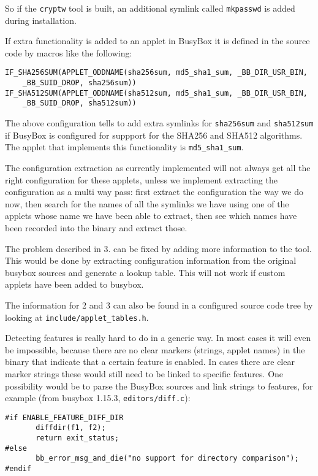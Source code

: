 \documentclass[10pt]{article}
\begin{document}
So if the \texttt{cryptw} tool is built, an additional symlink called
\texttt{mkpasswd} is added during installation.

If extra functionality is added to an applet in BusyBox it is defined in the
source code by macros like the following:

\begin{verbatim}
IF_SHA256SUM(APPLET_ODDNAME(sha256sum, md5_sha1_sum, _BB_DIR_USR_BIN,
    _BB_SUID_DROP, sha256sum))
IF_SHA512SUM(APPLET_ODDNAME(sha512sum, md5_sha1_sum, _BB_DIR_USR_BIN,
    _BB_SUID_DROP, sha512sum))
\end{verbatim}

The above configuration tells to add extra symlinks for \texttt{sha256sum} and
\texttt{sha512sum} if BusyBox is configured for suppport for the SHA256 and
SHA512 algorithms. The applet that implements this functionality is
\texttt{md5\_sha1\_sum}.

The configuration extraction as currently implemented will not always get all the right configuration for these applets, unless we implement extracting the configuration as a multi way pass: first extract the configuration the way we do now, then search for the names of all the symlinks we have using one of the applets whose name we have been able to extract, then see which names have been recorded into the binary and extract those.

The problem described in 3. can be fixed by adding more information to the tool. This would be done by extracting configuration information from the original busybox sources and generate a lookup table. This will not work if custom applets have been added to busybox.

The information for 2 and 3 can also be found in a configured source code tree by looking at \texttt{include/applet\_tables.h}.

Detecting features is really hard to do in a generic way. In most cases it will
even be impossible, because there are no clear markers (strings, applet names)
in the binary that indicate that a certain feature is enabled. In cases there
are clear marker strings these would still need to be linked to specific
features. One possibility would be to parse the BusyBox sources and link
strings to features, for example (from busybox 1.15.3,
\texttt{editors/diff.c}):

\begin{verbatim}
#if ENABLE_FEATURE_DIFF_DIR
       diffdir(f1, f2);
       return exit_status;
#else
       bb_error_msg_and_die("no support for directory comparison");
#endif
\end{verbatim}
\end{document}
